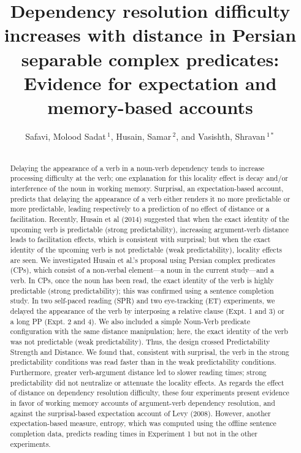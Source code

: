 \documentclass{frontiersSCNS}\usepackage{knitr} %
\def\firstAuthorLast{Safavi {et~al.}} %
\def\Authors{Safavi, Molood Sadat\,$^{1}$,  Husain, Samar\,$^{2}$, and Vasishth, Shravan\,$^{1*}$}
\begin{document}
\onecolumn
{}

\title[Dependency resolution difficulty in Persian complex predicates]{Dependency resolution difficulty increases with distance in Persian separable complex
predicates: Evidence for expectation and memory-based accounts}
\author[\firstAuthorLast ]{\Authors}
\address{}
\correspondance{}
\extraAuth{}

\maketitle


\begin{abstract}
\section{}
Delaying the appearance of a verb in a noun-verb dependency tends to increase processing difficulty at the verb; one explanation for this locality effect is decay and/or interference of the noun in working memory. Surprisal, an expectation-based account, predicts that delaying the appearance of a verb either renders it no more predictable or more predictable, leading respectively to a prediction of no effect of distance or a facilitation.  Recently, Husain et al (2014) suggested that when the exact identity of the upcoming verb is predictable (strong predictability), increasing argument-verb distance leads to facilitation effects, which is consistent with surprisal; but when the exact identity of the upcoming verb is not predictable (weak predictability), locality effects are seen. We investigated Husain et al.'s proposal using Persian complex predicates (CPs), which consist of a non-verbal element---a noun in the current study---and a verb. In CPs, once the noun has been read, the exact identity of the verb is highly predictable (strong predictability); this was confirmed using a sentence completion study. In two self-paced reading (SPR) and two eye-tracking (ET) experiments, we delayed the appearance of the verb by interposing a relative clause (Expt. 1 and 3) or a long PP (Expt. 2 and 4). 
We also included a simple Noun-Verb predicate configuration with the same distance manipulation; here, the exact identity of the verb was not predictable (weak predictability). Thus, the design crossed Predictability Strength and Distance.  We found that, consistent with surprisal, the verb in the strong predictability conditions was read faster than in the weak predictability conditions. Furthermore, greater verb-argument distance led to slower reading times;  strong predictability did not neutralize or attenuate the locality effects. As regards the effect of distance on dependency resolution difficulty, these four experiments  present evidence in favor of  working memory accounts of argument-verb dependency resolution, and against the surprisal-based expectation account of Levy (2008). However, another expectation-based measure, entropy, which was computed using the offline sentence completion data, predicts reading times in Experiment 1 but not in the other experiments. 

\end{abstract}
\end{document}
